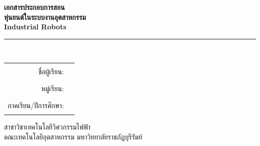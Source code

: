 \documentclass[10pt,a4paper]{extarticle}
\begin{document}
\begin{titlepage}
\begin{center}
    \vspace*{1.2cm}
    {\Huge\bfseries เอกสารประกอบการสอน}\\[1.0em]
    {\LARGE\bfseries หุ่นยนต์ในระบบงานอุตสาหกรรม}\\[1.0em]
    {\Large\bfseries Industrial Robots}\\[1.5em]
    \rule{0.82\textwidth}{0.8pt}\\[1.2em]
   

    \vfill

    \begin{tabular}{rl}
        ชื่อผู้เรียน: & \rule{9cm}{0.4pt} \\[1em]
        หมู่เรียน: & \rule{9cm}{0.4pt} \\[1em]
        ภาคเรียน/ปีการศึกษา: & \rule{9cm}{0.4pt}
    \end{tabular}

    \vfill
    {\large สาขาวิชาเทคโนโลยีวิศวกรรมไฟฟ้า}\\[0.25em]
    {\large คณะเทคโนโลยีอุตสาหกรรม มหาวิทยาลัยราชภัฏบุรีรัมย์}
\end{center}
\end{titlepage}

\tableofcontents
\clearpage
{}


%
%
%

\end{document}
